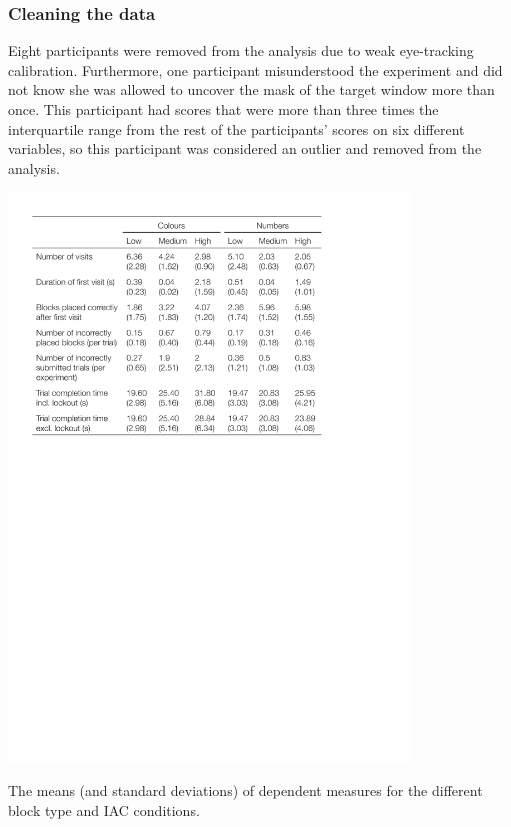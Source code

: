 \subsubsection{Cleaning the data}
Eight participants were removed from the analysis due to weak eye-tracking calibration. Furthermore, one participant misunderstood the experiment and did not know she was allowed to uncover the mask of the target window more than once. This participant had scores that were more than three times the interquartile range from the rest of the participants' scores on six different variables, so this participant was considered an outlier and removed from the analysis. 

\begin{table}
\centering
\includegraphics[width=0.8\textwidth]{images/ch34/ch34-3_Means.pdf}
\caption[Study 3 descriptive measures]{The means (and standard deviations) of dependent measures for the different block type and IAC conditions.}
\label{table:ch4_IACmeans}
\end{table}

